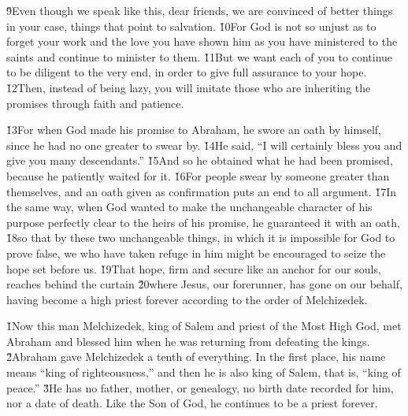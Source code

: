 \v{9}Even though we speak like this, dear friends, we are convinced of better things in your case, things that point to salvation. \v{10}For God is not so unjust as to forget your work and the love you have shown him as you have ministered to the saints and continue to minister to them. \v{11}But we want each of you to continue to be diligent to the very end, in order to give full assurance to your hope. \v{12}Then, instead of being lazy, you will imitate those who are inheriting the promises through faith and patience.

\v{13}For when God made his promise to Abraham, he swore an oath by himself, since he had no one greater to swear by. \v{14}He said, ``I will certainly bless you and give you many descendants.'' \v{15}And so he obtained what he had been promised, because he patiently waited for it. \v{16}For people swear by someone greater than themselves, and an oath given as confirmation puts an end to all argument. \v{17}In the same way, when God wanted to make the unchangeable character of his purpose perfectly clear to the heirs of his promise, he guaranteed it with an oath, \v{18}so that by these two unchangeable things, in which it is impossible for God to prove false, we who have taken refuge in him might be encouraged to seize the hope set before us. \v{19}That hope, firm and secure like an anchor for our souls, reaches behind the curtain \v{20}where Jesus, our forerunner, has gone on our behalf, having become a high priest forever according to the order of Melchizedek.

\v{1}Now this man Melchizedek, king of Salem and priest of the Most High God, met Abraham and blessed him when he was returning from defeating the kings. \v{2}Abraham gave Melchizedek a tenth of everything. In the first place, his name means ``king of righteousness,'' and then he is also king of Salem, that is, ``king of peace.'' \v{3}He has no father, mother, or genealogy, no birth date recorded for him, nor a date of death. Like the Son of God, he continues to be a priest forever.

